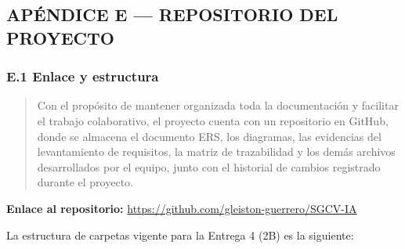 \documentclass[
]{article}
\begin{document}

\subsection{APÉNDICE E --- REPOSITORIO DEL PROYECTO}\label{apendice-e-repositorio}

\subsubsection{E.1 Enlace y estructura}\label{e1-enlace-y-estructura}

\begin{quote}
Con el propósito de mantener organizada toda la documentación y
facilitar el trabajo colaborativo, el proyecto cuenta con un
repositorio en GitHub, donde se almacena el documento ERS, los
diagramas, las evidencias del levantamiento de requisitos, la matriz
de trazabilidad y los demás archivos desarrollados por el equipo,
junto con el historial de cambios registrado durante el proyecto.
\end{quote}

\noindent\textbf{Enlace al repositorio:}
\url{https://github.com/gleiston-guerrero/SGCV-IA}

\vspace{0.2cm}
\noindent{}
\vspace{0.3cm}
\noindent La estructura de carpetas vigente para la Entrega 4 (2B) es la
siguiente:
\end{document}
